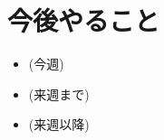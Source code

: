 \documentclass{ltjsarticle}
\begin{document}
        \section{今後やること}
            \begin{itemize}
                \item (今週)
                \item (来週まで)
                \item (来週以降)
            \end{itemize}
\end{document}

